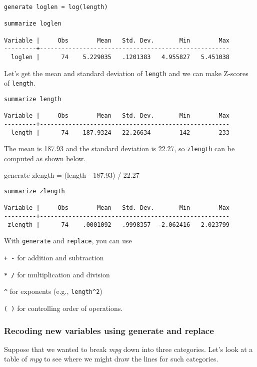 \begin{lstlisting}
generate loglen = log(length)

summarize loglen

Variable |     Obs        Mean   Std. Dev.       Min        Max
---------+-----------------------------------------------------
  loglen |      74    5.229035   .1201383   4.955827   5.451038
\end{lstlisting}

Let's get the mean and standard deviation of \lstinline{length} and we can make Z-scores of \lstinline{length}.

\begin{lstlisting}
summarize length

Variable |     Obs        Mean   Std. Dev.       Min        Max
---------+-----------------------------------------------------
  length |      74    187.9324   22.26634        142        233
\end{lstlisting}

The mean is 187.93 and the standard deviation is 22.27, so \lstinline{zlength} can be computed as shown below.

generate zlength = (length - 187.93) / 22.27

\begin{lstlisting}
summarize zlength

Variable |     Obs        Mean   Std. Dev.       Min        Max
---------+-----------------------------------------------------
 zlength |      74    .0001092   .9998357  -2.062416   2.023799
\end{lstlisting}

With \lstinline{generate} and \lstinline{replace}, you can use
\begin{compactitem}
\item \lstinline{+ -} for addition and subtraction
\item \lstinline{* /} for multiplication and division
\item \lstinline{^} for exponents (e.g., \lstinline{length^2})
\item \lstinline{( )} for controlling order of operations.
\end{compactitem}

\subsubsection{Recoding new variables using generate and replace}

Suppose that we wanted to break \textit{mpg} down into three categories. Let's look at a table of \textit{mpg} to see where we might draw the lines for such categories.

